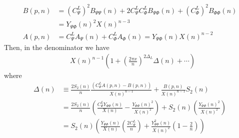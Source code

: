 \documentclass[11pt]{article}
\newcommand{\nn}{\nonumber}
\newcommand{\lb}{\left(}
\newcommand{\rb}{\right)}
\begin{document}
  \begin{align}
    B(p,n) & = {(C_{\Psi}^L)}^{2}B_{\Psi\Psi}(n)+2C_{\Psi}^LC_{\Phi}^LB_{\Psi\Phi}(n)+{(C_{\Phi}^L)}^{2}B_{\Phi\Phi}(n)\nn \\
           & =Y_{\Psi\Phi}(n)^{2}X(n)^{n-3}\nn                 \\
    A(p,n) & = C_{\Psi}^LA_{\Psi}(n)+C_{\Phi}^LA_{\Phi}(n)=Y_{\Psi\Phi}(n)X(n)^{n-2}
  \end{align}
  Then, in the denominator we have
  \begin{align}
     & X(n)^{n-1}\lb 1+\lb\frac{2\pi x}{n}\rb^{2\Delta_L}\Delta(n)+\cdots \rb
  \end{align}
  where
\begin{align}
    \Delta(n) & \equiv \frac{2S_{2}(n)}{n}\frac{(C_{\Psi}^LA(p,n)-B(p,n))}{X(n)^{n-1}}+\frac{B(p,n)}{X(n)^{n-1}}S_{2}(n)\nn                                                          \\
              & =\frac{2S_{2}(n)}{n}\lb \frac{C_{\Psi}^LY_{\Psi\Phi}(n)}{ X(n)}-\frac{Y_{\Psi\Phi}(n)^{2}}{X(n)^{2}}\rb+S_{2}(n)\lb \frac{Y_{\Psi\Phi}(n)^{2}}{X(n)^{2}}\rb \\
              & =S_{2}(n)\lb \frac{Y_{\Psi\Phi}(n)}{X(n)}\left(\frac{2C_{\Psi}^L}{n}\right)+\frac{Y_{\Psi\Phi}^{2}(n)}{X(n)^{2}}\lb 1-\frac{2}{n}\rb\rb                       %
\end{align}
\end{document}
